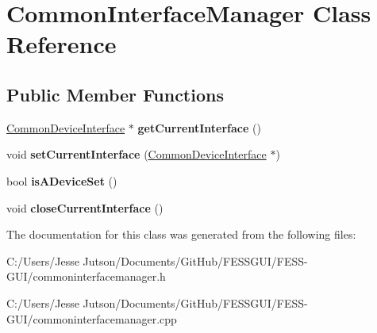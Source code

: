 \hypertarget{class_common_interface_manager}{}\section{Common\+Interface\+Manager Class Reference}
\label{class_common_interface_manager}
\subsection*{Public Member Functions}
\begin{DoxyCompactItemize}
\item 
\hypertarget{class_common_interface_manager_a24a72b0f78f9e6037e2da899e8170b2f}{}\label{class_common_interface_manager_a24a72b0f78f9e6037e2da899e8170b2f} 
\hyperlink{class_common_device_interface}{Common\+Device\+Interface} $\ast$ {\bfseries get\+Current\+Interface} ()
\item 
\hypertarget{class_common_interface_manager_add704853a060d8cca441da322b748c19}{}\label{class_common_interface_manager_add704853a060d8cca441da322b748c19} 
void {\bfseries set\+Current\+Interface} (\hyperlink{class_common_device_interface}{Common\+Device\+Interface} $\ast$)
\item 
\hypertarget{class_common_interface_manager_abd7a314803309cdb6789eaf36f90b7b7}{}\label{class_common_interface_manager_abd7a314803309cdb6789eaf36f90b7b7} 
bool {\bfseries is\+A\+Device\+Set} ()
\item 
\hypertarget{class_common_interface_manager_a16ab6917c45e1b40efe61d5379206ceb}{}\label{class_common_interface_manager_a16ab6917c45e1b40efe61d5379206ceb} 
void {\bfseries close\+Current\+Interface} ()
\end{DoxyCompactItemize}


The documentation for this class was generated from the following files\+:\begin{DoxyCompactItemize}
\item 
C\+:/\+Users/\+Jesse Jutson/\+Documents/\+Git\+Hub/\+F\+E\+S\+S\+G\+U\+I/\+F\+E\+S\+S-\/\+G\+U\+I/commoninterfacemanager.\+h\item 
C\+:/\+Users/\+Jesse Jutson/\+Documents/\+Git\+Hub/\+F\+E\+S\+S\+G\+U\+I/\+F\+E\+S\+S-\/\+G\+U\+I/commoninterfacemanager.\+cpp\end{DoxyCompactItemize}

